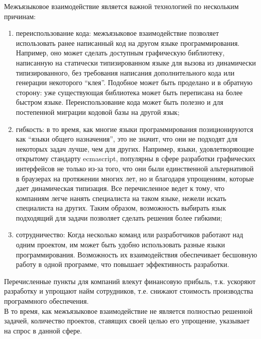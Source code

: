 \documentclass[times,specification,annotation]{itmo-student-thesis}
\begin{document}
Межъязыковое взаимодействие является важной технологией по нескольким причинам:

\begin{enumerate}
\item переиспользование кода: межъязыковое взаимодействие позволяет использовать ранее написанный код на другом языке программирования. Например, оно может сделать доступным графическую библиотеку, написанную на статически типизированном языке для вызова из динамически типизированного, без требования написания дополнительного кода или генерации некоторого ``клея''. Подобное может быть проделано и в обратную сторону: уже существующая библиотека может быть переписана на более быстром языке. Переиспользование кода может быть полезно и для постепенной миграции кодовой базы на другой язык;

\item гибкость: в то время, как многие языки программирования позиционируются как ``языки общего назначения'', это не значит, что они не подходят для некоторых задач лучше, чем для других. Например, языки, удовлетворяющие открытому стандарту ecmascript, популярны в сфере разработки графических интерфейсов не только из-за того, что они были единственной альтернативой в браузерах на протяжении многих лет, но и благодаря упрощениям, которые дает динамическая типизация. Все перечисленное ведет к тому, что компаниям легче нанять специалиста на таком языке, нежели искать специалиста на других. Таким образом, возможность выбирать язык подходящий для задачи позволяет сделать решения более гибкими;

\item сотрудничество: Когда несколько команд или разработчиков работают над одним проектом, им может быть удобно использовать разные языки программирования. Возможность их взаимодействия обеспечивает бесшовную работу в одной программе, что повышает эффективность разработки.
\end{enumerate}

Перечисленные пункты для компаний влекут финансовую прибыль, т.к. ускоряют разработку и упрощают найм сотрудников, т.е. снижают стоимость производства программного обеспечения.\\
В то время, как межъязыковое взаимодействие не является полностью решенной задачей, количество проектов, ставящих своей целью его упрощение, указывает на спрос в данной сфере.\\
\end{document}
